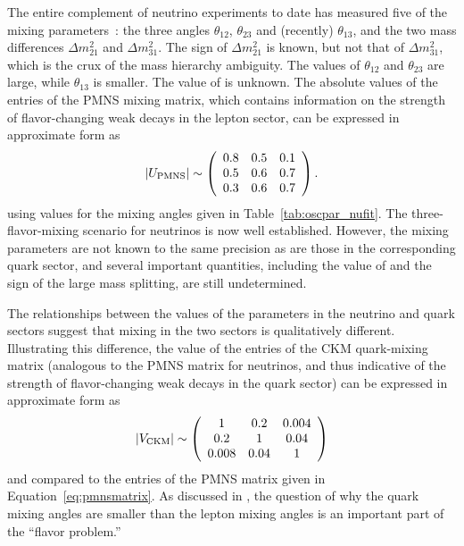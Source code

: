 The entire complement of neutrino experiments to date has measured
five of the mixing parameters~\cite{Gonzalez-Garcia:2014bfa}: the three angles $\theta_{12}$,
$\theta_{23}$ and (recently) $\theta_{13}$, and the two mass differences
$\Delta m^{2}_{21}$ and $\Delta m^{2}_{31}$. The sign of $\Delta
m^{2}_{21}$ is known, but not that of $\Delta m^{2}_{31}$, which 
is the crux of the 
mass hierarchy ambiguity.
The values of $\theta_{12}$ and $\theta_{23}$ are large, while 
$\theta_{13}$ is smaller. The value of \deltacp is unknown.
The absolute values of the entries of the PMNS mixing matrix, which
contains information on the strength of flavor-changing weak decays in
the lepton sector, can be expressed in approximate form as
\begin{equation}
|U_{\rm PMNS}|\sim \left(\begin{array}{ccc} 0.8 & 0.5 & 0.1 \\ 0.5 & 0.6 & 0.7 \\ 0.3 & 0.6 & 0.7\end{array} \right).
\label{eq:pmnsmatrix}
\end{equation}
using values for the mixing angles given in Table~\ref{tab:oscpar_nufit}.
The three-flavor-mixing scenario for neutrinos is now well
established. However, the mixing parameters are not known to the same precision 
as are those in the
corresponding quark sector, and several important quantities, including
the value of \deltacp and the sign of the large mass splitting, are
still undetermined. 

The relationships between the values of the parameters in the neutrino
and quark sectors suggest that mixing in the two sectors is
qualitatively different. Illustrating this difference, the value of
the entries of the CKM quark-mixing matrix (analogous to the PMNS matrix for
neutrinos, and thus indicative of the strength of flavor-changing weak
decays in the quark sector) can be expressed in approximate form as
\begin{equation}
|V_{\rm CKM}|\sim \left(\begin{array}{ccc} 1 & 0.2 & 0.004\\ 0.2 & 1 & 0.04 \\ 0.008 & 0.04 & 1\end{array} \right)
\label{eq:ckmmatrix}
\end{equation}
and compared to the entries of the PMNS matrix given in Equation~\ref{eq:pmnsmatrix}.
As discussed in \cite{King:2014nza}, the question of why the quark mixing angles are
smaller than the lepton mixing angles is an important part of the ``flavor problem.''


